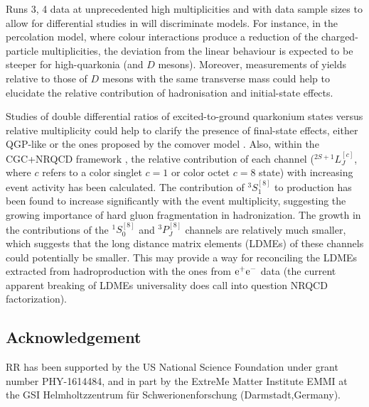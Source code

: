 \documentclass[../report.tex]{subfiles}
\providecommand{\main}{..}
\begin{document}
Runs 3, 4 data at unprecedented high multiplicities %
and with data sample sizes to allow for differential studies in \pT will discriminate models.
For instance, in the percolation model, where colour interactions produce a reduction of the charged-particle multiplicities, the deviation from the linear behaviour is expected to be steeper for high-\pT quarkonia (and $D$ mesons).
Moreover, measurements of \PJgy  yields relative to those of $D$ mesons with the same transverse mass could help to elucidate the relative contribution of hadronisation and initial-state effects.


Studies of double differential ratios of excited-to-ground quarkonium states versus relative multiplicity could help to clarify the presence of final-state effects, either QGP-like or the ones proposed by the comover model \cite{Ferreiro:2014bia,Ferreiro:2018wbd}.
Also, within the CGC+NRQCD framework \cite{Ma:2018bax}, the relative contribution of each channel ($^{2S+1}L_J^{[c]}$, where $c$ refers to a color singlet $c=1$ or color octet $c=8$ state) with increasing event activity has been calculated. 
%
The contribution of $^3S_1^{[8]}$ to \PJgy production has been found to increase significantly with the event multiplicity, suggesting the growing importance of hard gluon fragmentation in \PJgy hadronization. The growth in the contributions of the $^1S_0^{[8]}$  and $^3P_J^{[8]}$ channels are relatively much smaller, which suggests that the long distance matrix elements (LDMEs) of these channels could potentially be smaller. This may provide a way for reconciling the LDMEs extracted from hadroproduction with the ones from ${\rm e}^+{\rm e}^-$ data (the current apparent breaking of LDMEs universality does call into question NRQCD factorization).


\subsection*{Acknowledgement}
RR has been supported by the US National Science Foundation under
grant number PHY-1614484, and in part by the ExtreMe Matter Institute EMMI at 
the GSI Helmholtzzentrum f\"{u}r Schwerionenforschung (Darmstadt,Germany).
\end{document}
